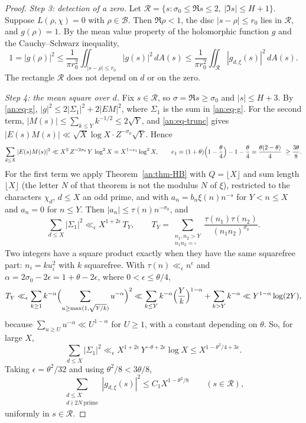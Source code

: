 \documentclass[10pt]{amsart}
\theoremstyle{definition}
\theoremstyle{remark}
\begin{document}
\begin{proof}
\emph{Step 3: detection of a zero.} Let
$\mathcal R=\{s:\sigma_0\le\Re s\le2,\ |\Im s|\le H+1\}$. Suppose
$L(\rho,\chi)=0$ with $\rho\in\mathcal B$. Then $\Re\rho<1$, the disc
$|s-\rho|\le r_0$ lies in $\mathcal R$, and $g(\rho)=1$. By the mean value
property of the holomorphic function $g$ and the Cauchy--Schwarz inequality,
\begin{equation}\label{an:eq-detect}
 1=|g(\rho)|^2\le\frac1{\pi r_0^2}\iint_{|s-\rho|\le r_0}|g(s)|^2\,dA(s)\le\frac1{\pi r_0^2}\iint_{\mathcal R}|g_{d,\xi}(s)|^2\,dA(s).
\end{equation}
The rectangle $\mathcal R$ does not depend on $d$ or on the zero.

\emph{Step 4: the mean square over $d$.} Fix $s\in\mathcal R$, so
$\sigma=\Re s\ge\sigma_0$ and $|s|\le H+3$. By \eqref{an:eq-g},
$|g|^2\le2|\Sigma_1|^2+2|EM|^2$, where $\Sigma_1$ is the sum in
\eqref{an:eq-g}. For the second term, $|M(s)|\le\sum_{k\le Y}k^{-1/2}\le2\sqrt Y$,
and \eqref{an:eq-trunc} gives $|E(s)M(s)|\ll\sqrt X\log X\cdot Z^{-\sigma_0}\sqrt Y$.
Hence
\[
 \sum_{d\le X}|E(s)M(s)|^2\ll X^{2}\,Z^{-2\sigma_0}\,Y\,\log^2X=X^{1-e_1}\log^2X,\qquad
 e_1=(1+\theta)\Bigl(1-\frac\theta4\Bigr)-1-\frac\theta4=\frac{\theta(2-\theta)}4\ \ge\frac{3\theta}8 .
\]
For the first term we apply Theorem~\ref{an:thm-HB} with $Q=\lfloor X\rfloor$ and sum length $\lfloor X\rfloor$ (the letter $N$ of that theorem is not the modulus $N$ of $\xi$), restricted to the characters $\chi_d$, $d\le X$ an odd prime, and with
$a_n=b_n\xi(n)n^{-s}$ for $Y<n\le X$ and $a_n=0$ for $n\le Y$. Then
$|a_n|\le\tau(n)n^{-\sigma_0}$, and
\[
 \sum_{d\le X}|\Sigma_1|^2\ll_\epsilon X^{1+2\epsilon}\,T_Y,\qquad
 T_Y=\sum_{\substack{n_1,n_2>Y\\ n_1n_2=\square}}\frac{\tau(n_1)\tau(n_2)}{(n_1n_2)^{\sigma_0}} .
\]
Two integers have a square product exactly when they have the same
squarefree part: $n_i=ku_i^2$ with $k$ squarefree. With
$\tau(n)\ll_\epsilon n^{\epsilon}$ and $\alpha=2\sigma_0-2\epsilon=1+\theta-2\epsilon$,
where $0<\epsilon\le\theta/4$,
\[
 T_Y\ll_\epsilon\sum_{k\ge1}k^{-\alpha}\Bigl(\sum_{u\ge\max(1,\sqrt{Y/k})}u^{-\alpha}\Bigr)^2
 \ll\sum_{k\le Y}k^{-\alpha}\Bigl(\frac Yk\Bigr)^{1-\alpha}+\sum_{k>Y}k^{-\alpha}\ll Y^{1-\alpha}\log(2Y),
\]
because $\sum_{u\ge U}u^{-\alpha}\ll U^{1-\alpha}$ for $U\ge1$, with a
constant depending on $\theta$. So, for large $X$,
\[
 \sum_{d\le X}|\Sigma_1|^2\ll_\epsilon X^{1+2\epsilon}\,Y^{-\theta+2\epsilon}\log X\le X^{1-\theta^2/4+3\epsilon}.
\]
Taking $\epsilon=\theta^2/32$ and using $\theta^2/8<3\theta/8$,
\begin{equation}\label{an:eq-ms}
 \sum_{\substack{d\le X\\ d\nmid 2N\ \mathrm{prime}}}|g_{d,\xi}(s)|^2\le C_1X^{1-\theta^2/8}\qquad(s\in\mathcal R),
\end{equation}
uniformly in $s\in\mathcal R$.


\end{proof}
\end{document}
